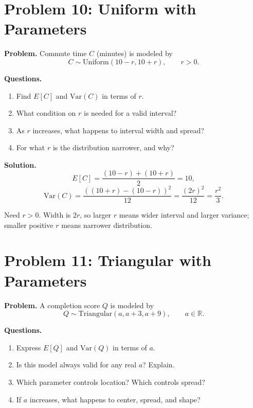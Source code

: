 \section{Problem 10: Uniform with Parameters}

\textbf{Problem.}
Commute time \(C\) (minutes) is modeled by
\[
C\sim \text{Uniform}(10-r,10+r),\qquad r>0.
\]

\textbf{Questions.}
\begin{enumerate}
  \item Find \(E[C]\) and \(\mathrm{Var}(C)\) in terms of \(r\).
  \item What condition on \(r\) is needed for a valid interval?
  \item As \(r\) increases, what happens to interval width and spread?
  \item For what \(r\) is the distribution narrower, and why?
\end{enumerate}

\textbf{Solution.}
\[
E[C]=\frac{(10-r)+(10+r)}{2}=10,
\]
\[
\mathrm{Var}(C)=\frac{((10+r)-(10-r))^2}{12}=\frac{(2r)^2}{12}=\frac{r^2}{3}.
\]
\begin{center}
\end{center}
Need \(r>0\). Width is \(2r\), so larger \(r\) means wider interval and larger variance; smaller positive \(r\) means narrower distribution.

\section{Problem 11: Triangular with Parameters}

\textbf{Problem.}
A completion score \(Q\) is modeled by
\[
Q\sim \text{Triangular}(a,a+3,a+9),\qquad a\in\mathbb{R}.
\]

\textbf{Questions.}
\begin{enumerate}
  \item Express \(E[Q]\) and \(\mathrm{Var}(Q)\) in terms of \(a\).
  \item Is this model always valid for any real \(a\)? Explain.
  \item Which parameter controls location? Which controls spread?
  \item If \(a\) increases, what happens to center, spread, and shape?
\end{enumerate}

